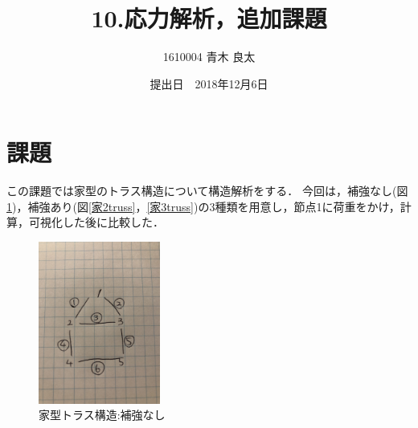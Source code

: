 \documentclass[a4paper,11pt,uplatex]{jsarticle}
\title{10.応力解析，追加課題}
\author{1610004 青木 良太}
\date{提出日　2018年12月6日} %
\begin{document}
\maketitle

\section{課題}
この課題では家型のトラス構造について構造解析をする．
今回は，補強なし(図\ref{家1truss})，補強あり(図\ref{家2truss}，\ref{家3truss})の3種類を用意し，節点1に荷重をかけ，計算，可視化した後に比較した．
\begin{figure}[H]
  \begin{center}
    \includegraphics[width = 4cm]{画像/square.jpg}
    \caption{家型トラス構造:補強なし}
    \label{家1truss}
  \end{center}
\end{figure}
\end{document}
